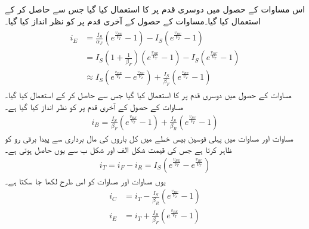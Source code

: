 اس مساوات کے حصول میں دوسری قدم پر  کا استعمال کیا گیا جس سے  حاصل کر کے استعمال کیا گیا۔مساوات کے حصول کے آخری قدم پر  کو نظر انداز کیا گیا۔
\begin{gather} \label{مساوات_ٹرانزسٹر_چارجوں_کی_مال_برداری_اور_مخارج_رو}
\begin{aligned}
i_E &=\frac{I_S}{\alpha_F} \left(e^{\frac{v_{BE}}{V_T}}-1 \right )-I_S \left(e^{\frac{v_{BC}}{V_T}}-1 \right )\\
&=I_S \left(1+\frac{1}{\beta_F} \right ) \left(e^{\frac{v_{BE}}{V_T}}-1 \right ) -I_S \left(e^{\frac{v_{BC}}{V_T}}-1 \right )\\
&\approx I_S \left(e^{\frac{v_{BE}}{V_T}}-e^{\frac{v_{BC}}{V_T}} \right ) +\frac{I_S}{\beta_F} \left(e^{\frac{v_{BE}}{V_T}}-1 \right )
\end{aligned}
\end{gather}
مساوات  کے حصول میں دوسری قدم پر  کا استعمال کیا گیا جس سے  حاصل کر کے استعمال کیا گیا۔مساوات کے حصول کے آخری قدم پر  کو نظر انداز کیا گیا ہے۔
\begin{align} \label{مساوات_ٹرانزسٹر_چارجوں_کی_مال_برداری_اور_قابو_رو}
i_B =\frac{I_S}{\beta_F}\left(e^{\frac{v_{BE}}{V_T}}-1 \right ) +\frac{I_S}{\beta_R} \left(e^{\frac{v_{BC}}{V_T}}-1 \right )
\end{align}
مساوات   اور مساوات  میں پہلی  قوسین بیس خطے میں کل باروں کی مال برداری سے پیدا برقی رو    کو ظاہر کرتا ہے جس کی قیمت شکل  الف اور شکل  ب سے یوں حاصل ہوتی ہے۔
\begin{align}
i_T =i_F-i_R =I_S \left(e^{\frac{v_{BE}}{V_T}}-e^{\frac{v_{BC}}{V_T}} \right )
\end{align}
یوں مساوات  اور مساوات   کو اس طرح لکھا جا سکتا ہے۔
\begin{align}
i_C&=i_T-\frac{I_S}{\beta_R} \left(e^{\frac{v_{BC}}{V_T}}-1 \right )\\
i_E&=i_T+\frac{I_S}{\beta_F} \left(e^{\frac{v_{BE}}{V_T}}-1 \right )
\end{align}


